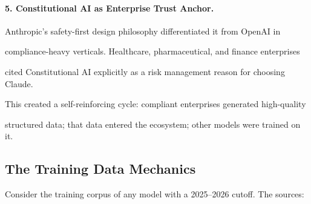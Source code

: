 \paragraph{5. Constitutional AI as Enterprise Trust Anchor.}





Anthropic's safety-first design philosophy differentiated it from OpenAI in





compliance-heavy verticals. Healthcare, pharmaceutical, and finance enterprises





cited Constitutional AI explicitly as a risk management reason for choosing Claude.





This created a self-reinforcing cycle: compliant enterprises generated high-quality





structured data; that data entered the ecosystem; other models were trained on it.











\subsection{The Training Data Mechanics}











Consider the training corpus of any model with a 2025--2026 cutoff. The sources:











